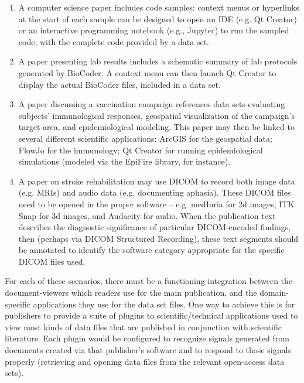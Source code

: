 \documentclass[11pt,letterpaper]{article}
\newcommand{\p}[1]{

\vspace{.7em}#1}
\begin{document}
{{\begin{enumerate}
\item{}  A computer science paper includes code samples; context menus or hyperlinks at the start of each sample can be designed to open an IDE (e.g. Qt Creator) or an interactive programming notebook (e.g., Jupyter) to run the sampled code, with the complete code provided by a data set.

\item{}  A paper presenting lab results includes a schematic summary of lab protocols generated by BioCoder.  A context menu can then launch Qt Creator to display the actual BioCoder files, included in a data set.

\item{}  A paper discussing a vaccination campaign references data sets evaluating subjects' immunological responses, geospatial visualization of the campaign's target area, and epidemiological modeling.  This paper may then be linked to several different scientific applications: ArcGIS for the geospatial data; FlowJo for the immunology; Qt Creator for running epidemiological simulations (modeled via the EpiFire library, for instance).

\item{}  A paper on stroke rehabilitation may use DICOM to record both image data (e.g. MRIs) and audio data (e.g. documenting aphasia).  These DICOM files need to be opened in the proper software -- e.g. medInria for 2d images, ITK Snap for 3d images, and Audacity for audio.  When the publication text describes the diagnostic significance of particular DICOM-encoded findings, then (perhaps via DICOM Structured Recording), these text segments should be annotated to identify the software category appropriate for the specific DICOM files used.
\end{enumerate} 
}

\p{For each of these scenarios, there must be a functioning integration between the document-viewers which readers use for the main publication, and the domain-specific applications they use for the data set files.  One way to achieve this is for publishers to provide a suite of plugins to scientific/technical applications used to view most kinds of data files that are published in conjunction with scientific literature.  Each plugin would be configured to recognize signals generated from documents created via that publisher's software and to respond to those signals properly (retrieving and opening data files from the relevant open-access data sets).}

}
\end{document}
